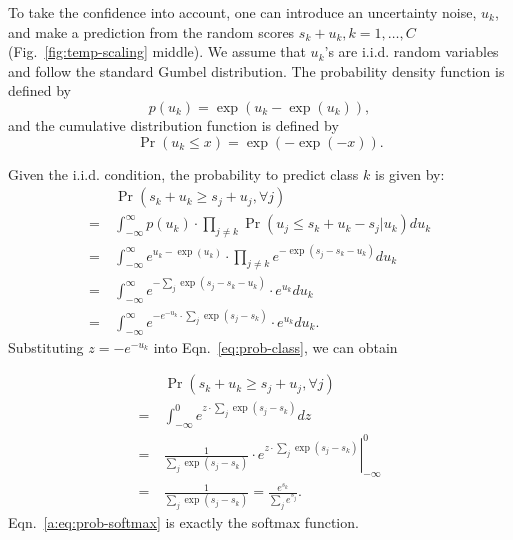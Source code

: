 \documentclass[letterpaper]{article} %
\begin{document}
To take the confidence into account, one can introduce an uncertainty noise, $u_k$, and make a prediction from the random scores $s_k + u_k, k = 1, \dots, C$ (Fig.~\ref{fig:temp-scaling} middle). We assume that $u_k$'s are i.i.d. random variables and follow the standard Gumbel distribution. The probability density function is defined by
\begin{equation}
  p(u_k) = \exp(u_k - \exp(u_k)),
  \label{eq:gumbel_pdf}
\end{equation}
and the cumulative distribution function is defined by
\begin{equation}
  \Pr(u_k \leq x) = \exp(-\exp(-x)).
  \label{eq:gumbel_cdf}
\end{equation}

Given the i.i.d. condition, the probability to predict class $k$ is given by:
\begin{equation}
  \begin{aligned}
    & \Pr(s_k+u_k \geq s_j+u_j, \forall j) \\
    =\ & \int_{-\infty}^{\infty} p(u_k) \cdot \prod_{j\neq k} \Pr(u_j \leq s_k + u_k - s_j | u_k) d u_k \\
    =\ & \int_{-\infty}^{\infty} e^{u_k - \exp(u_k)}\cdot \prod_{j\neq k} e^{-\exp(s_j - s_k - u_k)} d u_k \\
    =\ & \int_{-\infty}^{\infty} e^{- \sum_{j} \exp(s_j - s_k - u_k)}\cdot e^{u_k} d u_k \\
    =\ & \int_{-\infty}^{\infty} e^{- e^{-u_k}\cdot \sum_{j} \exp(s_j - s_k)}\cdot e^{u_k} d u_k.
  \end{aligned}
  \label{eq:prob-class}
\end{equation}
Substituting $z = -e^{-u_k}$ into Eqn.~\ref{eq:prob-class}, we can obtain

\begin{equation}
  \begin{aligned}
    & \Pr(s_k+u_k \geq s_j+u_j, \forall j) \\
    =\ & \int_{-\infty}^{0} e^{z\cdot \sum_{j} \exp(s_j - s_k)} dz \\
    =\ & \left.\frac{1}{\sum_{j} \exp(s_j - s_k)} \cdot e^{z\cdot \sum_{j} \exp(s_j - s_k)} \right|_{-\infty}^{0} \\
    =\ & \frac{1}{\sum_{j} \exp(s_j - s_k)} = \frac{e^{s_k}}{\sum_{j} e^{s_j}}.
  \end{aligned}
  \label{a:eq:prob-softmax}
\end{equation}
Eqn.~\ref{a:eq:prob-softmax} is exactly the softmax function.
\end{document}

